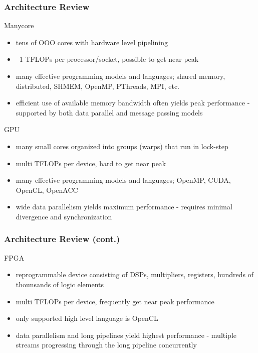 \documentclass{beamer}
\begin{document}
\begin{frame}
  \frametitle{Architecture Review}
  Manycore
  \begin{itemize}
    \item tens of OOO cores with hardware level pipelining
    \item ~1 TFLOPs per processor/socket, possible to get near peak
    \item many effective programming models and languages; shared memory,
      distributed, SHMEM, OpenMP, PThreads, MPI, etc.
    \item efficient use of available memory bandwidth often yields peak performance - 
      supported by both data parallel and message passing models
  \end{itemize}
  GPU
  \begin{itemize}
    \item many small cores organized into groups (warps) that run in lock-step
    \item multi TFLOPs per device, hard to get near peak
    \item many effective programming models and languages; OpenMP, CUDA, OpenCL,
      OpenACC
    \item wide data parallelism yields maximum performance - requires minimal divergence
      and synchronization
  \end{itemize}
\end{frame}

\begin{frame}
  \frametitle{Architecture Review (cont.)}
  FPGA
  \begin{itemize}
    \item reprogrammable device consisting of DSPs, multipliers, registers, hundreds of
      thounsands of logic elements
    \item multi TFLOPs per device, frequently get near peak performance
    \item only supported high level language is OpenCL
    \item data parallelism and long pipelines yield highest performance - multiple streams
      progressing through the long pipeline concurrently
  \end{itemize}
\end{frame}
\end{document}

